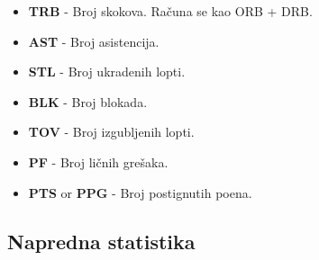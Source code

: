 \documentclass[a4paper]{article}
\begin{document}
\begin{itemize}
    \item \textbf{TRB} - Broj skokova. Računa se kao ORB + DRB.
    \item \textbf{AST} - Broj asistencija.
    \item \textbf{STL} - Broj ukradenih lopti.
    \item \textbf{BLK} - Broj blokada.
    \item \textbf{TOV} - Broj izgubljenih lopti.
    \item \textbf{PF} - Broj ličnih grešaka.
    \item \textbf{PTS} or \textbf{PPG} - Broj postignutih poena.
\end{itemize}	

\subsection{Napredna statistika}
\label{subsec:napr_stat}
\end{document}
